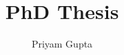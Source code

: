 \documentclass[12pt,a4paper]{report}
\begin{document}
\title{PhD Thesis}
\author{Priyam Gupta}
\maketitle

\tableofcontents


\end{document}
